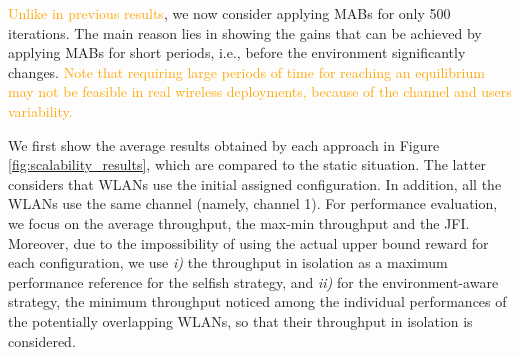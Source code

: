 \documentclass[preprint,12pt]{elsarticle}
\begin{document}
\textcolor{orange}{Unlike in previous results}, we now consider applying MABs for only 500 iterations. The main reason lies in showing the gains that can be achieved by applying MABs for short periods, i.e., before the environment significantly changes. \textcolor{orange}{Note that requiring large periods of time for reaching an equilibrium may not be feasible in real wireless deployments, because of the channel and users variability.}

We first show the average results obtained by each approach in Figure \ref{fig:scalability_results}, which are compared to the static situation. The latter considers that WLANs use the initial assigned configuration. In addition, all the WLANs use the same channel (namely, channel 1). For performance evaluation, we focus on the average throughput, the max-min throughput and the JFI. Moreover, due to the impossibility of using the actual upper bound reward for each configuration, we use \emph{i)} the throughput in isolation as a maximum performance reference for the selfish strategy, and \emph{ii)} for the environment-aware strategy, the minimum throughput noticed among the individual performances of the potentially overlapping WLANs, so that their throughput in isolation is considered.
\end{document}
